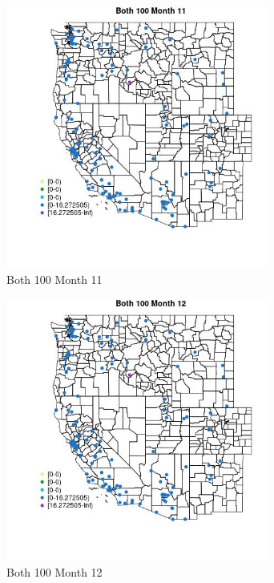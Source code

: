 \begin{figure} 
\centering  
\includegraphics[width=0.77\textwidth]{Code_Outputs/Report_ML_input_PM25_Step4_part_e_de_duplicated_aves_MapObsMo11Both_100.jpg} 
\caption{\label{fig:Report_ML_input_PM25_Step4_part_e_de_duplicated_avesMapObsMo11Both_100}Both 100 Month 11} 
\end{figure} 
 

\begin{figure} 
\centering  
\includegraphics[width=0.77\textwidth]{Code_Outputs/Report_ML_input_PM25_Step4_part_e_de_duplicated_aves_MapObsMo12Both_100.jpg} 
\caption{\label{fig:Report_ML_input_PM25_Step4_part_e_de_duplicated_avesMapObsMo12Both_100}Both 100 Month 12} 
\end{figure} 
 

